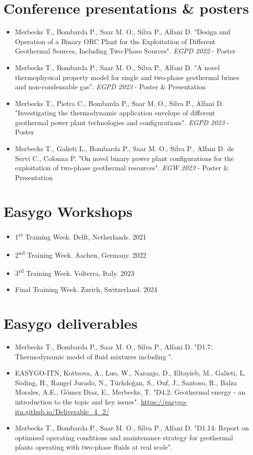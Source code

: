 \section*{Conference presentations \& posters}
    \begin{itemize}
        \item Merbecks T., Bombarda P., Saar M. O., Silva P., Alfani D. "Design and Operation of a Binary ORC Plant for the Exploitation of Different Geothermal Sources, Including Two-Phase Sources". \textit{EGPD 2022} - Poster
        \item Merbecks T., Bombarda P., Saar M. O., Silva P., Alfani D. "A novel thermophysical property model for single and two-phase geothermal brines and non-condensable gas". \textit{EGPD 2023} - Poster \& Presentation
        \item Merbecks T., Pietra C., Bombarda P., Saar M. O., Silva P., Alfani D. "Investigating the thermodynamic application envelope of different geothermal power plant technologies and configurations". \textit{EGPD 2023} - Poster
        \item Merbecks T., Galieti L., Bombarda P., Saar M. O., Silva P., Alfani D. de Servi C., Colonna P. "On novel binary power plant configurations for the exploitation of two-phase geothermal resources". \textit{EGW 2023} - Poster \& Presentation
    \end{itemize}


\section*{Easygo Workshops}
    \begin{itemize}
        \item 1\textsuperscript{st} Training Week. Delft, Netherlands. 2021
        \item 2\textsuperscript{nd} Training Week. Aachen, Germany. 2022
        \item 3\textsuperscript{rd} Training Week. Volterra, Italy. 2023
        \item Final Training Week. Zurich, Switzerland. 2024
    \end{itemize}

\section*{Easygo deliverables}
    \begin{itemize}
        \item Merbecks T., Bombarda P., Saar M. O., Silva P., Alfani D. "D1.7: Thermodynamic model of fluid mixtures including ".
        \item EASYGO-ITN, Kottsova, A., Luo, W., Naranjo, D., Eltayieb, M., Galieti, L. Söding, H., Rangel Jurado, N., Türkdoğan, S., Ouf, J., Santoso, R., Balza Morales, A.E., Gómez Diaz, E., Merbecks, T. "D4.2: Geothermal energy - an introduction to the topic and key issues". \url{https://easygo-itn.github.io/Deliverable_4_2/}
        \item Merbecks T., Bombarda P., Saar M. O., Silva P., Alfani D. "D1.14: Report on optimised operating conditions and maintenance strategy for geothermal plants operating with two-phase fluids at real scale".
    \end{itemize}